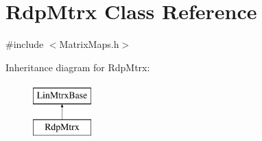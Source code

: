 \hypertarget{classRdpMtrx}{}\section{Rdp\+Mtrx Class Reference}
\label{classRdpMtrx}


{\ttfamily \#include $<$Matrix\+Maps.\+h$>$}

Inheritance diagram for Rdp\+Mtrx\+:\begin{figure}[H]
\begin{center}
\leavevmode
\includegraphics[height=2.000000cm]{classRdpMtrx}
\end{center}
\end{figure}
